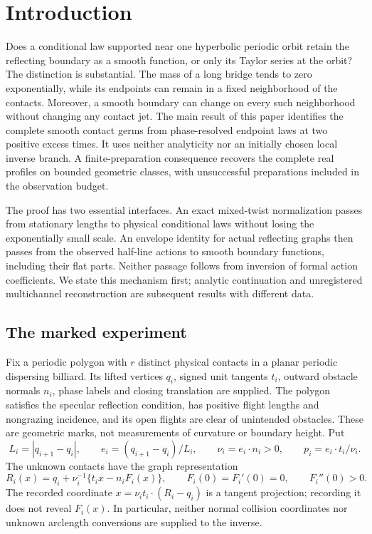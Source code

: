 \section{Introduction}
\label{sec:v70-introduction}

Does a conditional law supported near one hyperbolic periodic orbit
retain the reflecting boundary as a smooth function, or only its Taylor
series at the orbit?  The distinction is substantial.  The mass of a long
bridge tends to zero exponentially, while its endpoints can remain in a
fixed neighborhood of the contacts.  Moreover, a smooth boundary can
change on every such neighborhood without changing any contact jet.
The main result of this paper identifies the complete smooth contact
germs from phase-resolved endpoint laws at two positive excess times.
It uses neither analyticity nor an initially chosen local inverse branch.
A finite-preparation consequence recovers the complete real profiles on
bounded geometric classes, with unsuccessful preparations included in
the observation budget.

The proof has two essential interfaces.  An exact mixed-twist
normalization passes from stationary lengths to physical conditional
laws without losing the exponentially small scale.  An envelope identity
for actual reflecting graphs then passes from the observed half-line
actions to smooth boundary functions, including their flat parts.
Neither passage follows from inversion of formal action coefficients.
We state this mechanism first; analytic continuation and unregistered
multichannel reconstruction are subsequent results with different data.

\subsection{The marked experiment}

Fix a periodic polygon with $r$ distinct physical contacts in a planar
periodic dispersing billiard.  Its lifted vertices $q_i$, signed unit
tangents $t_i$, outward obstacle normals $n_i$, phase labels and closing
translation are supplied.  The polygon satisfies the specular reflection
condition, has positive flight lengths and nongrazing incidence, and its
open flights are clear of unintended obstacles.  These are geometric
marks, not measurements of curvature or boundary height.  Put
\[
 L_i=|q_{i+1}-q_i|,\qquad e_i=(q_{i+1}-q_i)/L_i,\qquad
 \nu_i=e_i\cdot n_i>0,\qquad p_i=e_i\cdot t_i/\nu_i.
\]
The unknown contacts have the graph representation
\begin{equation}\label{eq:v70-graphs}
 R_i(x)=q_i+\nu_i^{-1}\{t_i x-n_iF_i(x)\},\qquad
 F_i(0)=F_i'(0)=0,\qquad F_i''(0)>0.
\end{equation}
The recorded coordinate $x=\nu_i t_i\cdot(R_i-q_i)$ is a tangent
projection; recording it does not reveal $F_i(x)$.  In particular,
neither normal collision coordinates nor unknown arclength conversions
are supplied to the inverse.

